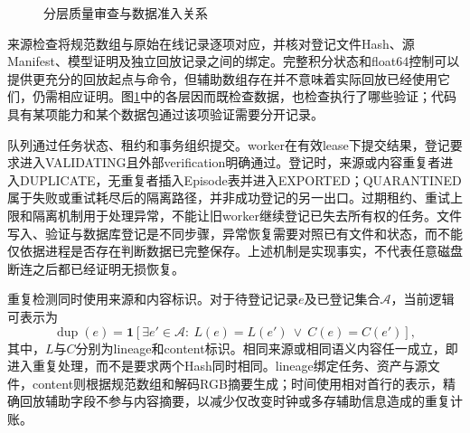 \begin{figure}[htbp]
 \centering
 \caption{分层质量审查与数据准入关系}
 \label{fig:ch04_admission}
\end{figure}

来源检查将规范数组与原始在线记录逐项对应，并核对登记文件Hash、源Manifest、模型证明及独立回放记录之间的绑定。完整积分状态和float64控制可以提供更充分的回放起点与命令，但辅助数组存在并不意味着实际回放已经使用它们，仍需相应证明。图\ref{fig:ch04_admission}中的各层因而既检查数据，也检查执行了哪些验证；代码具有某项能力和某个数据包通过该项验证需要分开记录。

队列通过任务状态、租约和事务组织提交。worker在有效lease下提交结果，登记要求进入\mbox{VALIDATING}且外部verification明确通过。登记时，来源或内容重复者进入\mbox{DUPLICATE}，无重复者插入Episode表并进入\mbox{EXPORTED}；\mbox{QUARANTINED}属于失败或重试耗尽后的隔离路径，并非成功登记的另一出口。过期租约、重试上限和隔离机制用于处理异常，不能让旧worker继续登记已失去所有权的任务。文件写入、验证与数据库登记是不同步骤，异常恢复需要对照已有文件和状态，而不能仅依据进程是否存在判断数据已完整保存。上述机制是实现事实，不代表任意磁盘断连之后都已经证明无损恢复。

重复检测同时使用来源和内容标识。对于待登记记录$e$及已登记集合$\mathcal A$，当前逻辑可表示为
\begin{equation}
 \operatorname{dup}(e)=\boldsymbol 1\!\left[
 \exists e'\in\mathcal A:\ L(e)=L(e')\ \lor\ C(e)=C(e')\right],
 \label{eq:ch04_duplicate}
\end{equation}
其中，$L$与$C$分别为lineage和content标识。相同来源或相同语义内容任一成立，即进入重复处理，而不是要求两个Hash同时相同。lineage绑定任务、资产与源文件，content则根据规范数组和解码RGB摘要生成；时间使用相对首行的表示，精确回放辅助字段不参与内容摘要，以减少仅改变时钟或多存辅助信息造成的重复计账。

